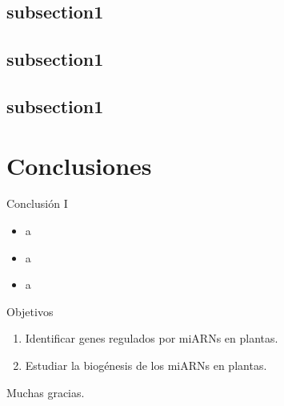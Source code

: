 \documentclass{beamer}
\begin{document}
\subsection{subsection1}
\subsection{subsection1}
\subsection{subsection1}


\section{Conclusiones}
\begin{frame}{Conclusión I}
	\begin{itemize}
        \item<1-> a
        \item<2-> a
        \item<3-> a
	\end{itemize}
\end{frame}


\begin{frame}{Objetivos}
    \pause
	\begin{enumerate}
        \item<-1> Identificar genes regulados por miARNs en plantas.
        \item<1-> Estudiar la biogénesis de los miARNs en plantas.
	\end{enumerate}
\end{frame}


\begin{frame}{}
	\begin{center}
		\Huge Muchas gracias.
	\end{center}
\end{frame}
\end{document}
